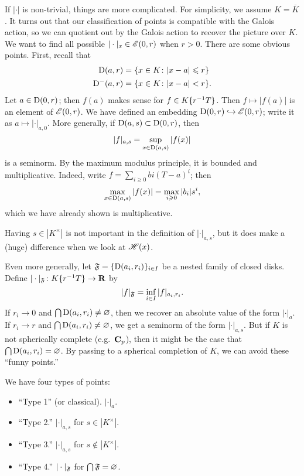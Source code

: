 If $|\cdot|$ is non-trivial, things are more complicated. For simplicity, we 
assume $K=\overline K$. It turns out that our classification of points is 
compatible with the Galois action, so we can quotient out by the Galois action 
to recover the picture over $K$. We want to find all possible 
$|\cdot|_x\in \mathscr{E}(0,r)$ when $r>0$. There are some obvious points. First, 
recall that 
\begin{align*}
	\operatorname{D}(a,r) &= \{x\in K\colon |x-a|\leqslant r\} \\
	\operatorname{D}^-(a,r) &= \{x\in K\colon |x-a|<r\} .
\end{align*}
Let $a\in \operatorname{D}(0,r)$; then $f(a)$ makes sense for $f\in K\{ r^{-1} T \}$. 
Then $f\mapsto |f(a)|$ is an element of $\mathscr{E}(0,r)$. We have defined an 
embedding $\operatorname{D}(0,r)\hookrightarrow \mathscr{E}(0,r)$; write it as 
$a\mapsto |\cdot|_{a,0}$. More generally, if $\operatorname{D}(a,s)\subset \operatorname{D}(0,r)$, 
then 
\[
	|f|_{a,s} = \sup_{x\in \operatorname{D}(a,s)} |f(x)|
\]
is a seminorm. By the maximum modulus principle, it is bounded and 
multiplicative. Indeed, write $f=\sum_{i\geqslant 0} bi (T-a)^i$; then 
\[
	\max_{x\in \operatorname{D}(a,s)} |f(x)| = \max_{i\geqslant 0} |b_i| s^i ,
\]
which we have already shown is multiplicative. 

Having $s\in |K^\times|$ is not important in the definition of $|\cdot|_{a,s}$, 
but it does make a (huge) difference when we look at $\mathscr{H}(x)$. 

Even more generally, let $\mathfrak{F}=\{\operatorname{D}(a_i,r_i)\}_{i\in I}$ be a nested family 
of closed disks. Define $|\cdot|_{\mathfrak{F}}\colon K\{ r^{-1} T \}\to \mathbf{R}$ by 
\[
	|f|_{\mathfrak{F}} = \inf_{i\in I} |f|_{a_i,r_i} .
\]
If $r_i\to 0$ and $\bigcap \operatorname{D}(a_i,r_i)\ne\varnothing$, then we recover an 
absolute value of the form $|\cdot|_a$. If $r_i\to r$ and 
$\bigcap \operatorname{D}(a_i,r_i)\ne\varnothing$, we get a seminorm of the form 
$|\cdot|_{a,s}$. But if $K$ is not spherically complete (e.g.~$\mathbf{C}_p$), then 
it might be the case that $\bigcap \operatorname{D}(a_i,r_i)=\varnothing$. By passing to a 
spherical completion of $K$, we can avoid these ``funny points.'' 

We have four types of points:
\begin{itemize}
\item ``Type 1'' (or classical). $|\cdot|_a$.

\item
``Type 2.'' $|\cdot|_{a,s}$ for $s\in |K^\times|$. 

\item
``Type 3.'' $|\cdot|_{a,s}$ for $s\notin |K^\times|$. 

\item
``Type 4.'' $|\cdot|_{\mathfrak{F}}$ for $\bigcap \mathfrak{F}=\varnothing$.  
\end{itemize}

